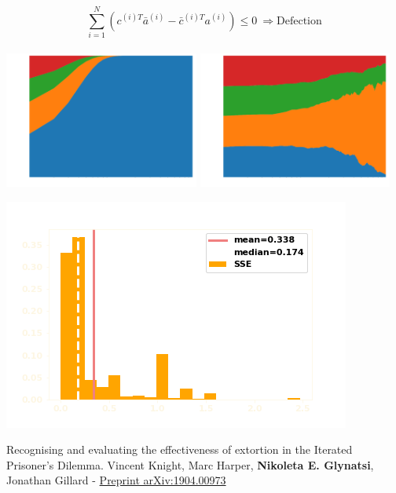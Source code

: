 \documentclass{beamer}
\begin{document}
\begin{frame}
    \begin{center}
    \[\sum_{i=1} ^ N (c^{(i)T} \bar{a}^{(i)} - \bar{c}^{(i)T} a^{(i)}) \leq 0 \ \Rightarrow \text{Defection}\] \\ \vspace{.5cm}
    \pause
    \includegraphics[width=0.48\textwidth]{static/population_defection_takes_over.png}\hspace{6pt}
    \includegraphics[width=0.48\textwidth]{static/population_defection_fails.png}\vspace{10pt}

    \end{center}
\end{frame}


\begin{frame}
    \begin{center}
    
    \end{center}
\end{frame}

\begin{frame}
    \begin{center}
    \includegraphics[width=.8\textwidth]{static/best_respones_sserror.png}

    \tiny{Recognising and evaluating the effectiveness of extortion in
    the Iterated Prisoner's Dilemma. Vincent Knight, Marc Harper, \textbf{Nikoleta E. Glynatsi},
    Jonathan Gillard -
    \href{https://arxiv.org/abs/1904.00973}{Preprint arXiv:1904.00973}}
    \end{center}
\end{frame}
\end{document}
